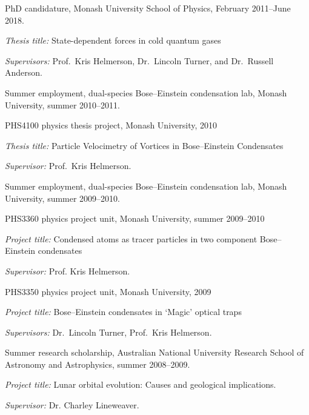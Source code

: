 \documentclass[10pt,a4paper]{article}
\renewenvironment{itemize}{
  \begin{list}{}{
    \setlength{\leftmargin}{1.5em}
    \setlength{\itemsep}{0.25em}
    \setlength{\parskip}{0pt}
    \setlength{\parsep}{0.25em}
  }
}{
  \end{list}
}
\begin{document}
\begin{itemize}
\item{PhD candidature, Monash University School of Physics, February 2011--June 2018.}
    \begin{itemize}
      \item \textit{Thesis title:}
      State-dependent forces in cold quantum gases
      \item\textit{Supervisors:}
      Prof.~Kris Helmerson, Dr.~Lincoln Turner, and Dr.~Russell Anderson.
    \end{itemize}
\item Summer employment, dual-species Bose--Einstein condensation lab, Monash University, summer 2010--2011.
\item PHS4100 physics thesis project, Monash University, 2010
    \begin{itemize}
      \item \textit{Thesis title:}
      Particle Velocimetry of Vortices in Bose--Einstein Condensates
      \item\textit{Supervisor:}
      Prof.~Kris Helmerson.
    \end{itemize}
\item Summer employment, dual-species Bose--Einstein condensation lab, Monash University, summer 2009--2010.
\item PHS3360 physics project unit, Monash University, summer 2009--2010
    \begin{itemize}
      \item \textit{Project title:}
      Condensed atoms as tracer particles in two component Bose--Einstein condensates
      \item\textit{Supervisor:}
      Prof. Kris Helmerson.
    \end{itemize}
\item PHS3350 physics project unit, Monash University, 2009
    \begin{itemize}
      \item \textit{Project title:}
      Bose--Einstein condensates in `Magic' optical traps
      \item\textit{Supervisors:}
      Dr.~Lincoln Turner, Prof.~Kris Helmerson.
    \end{itemize}    
\item Summer research scholarship, Australian National University Research School of Astronomy and Astrophysics, summer 2008--2009.
    \begin{itemize}
      \item \textit{Project title:}
      Lunar orbital evolution: Causes and geological implications.
      \item\textit{Supervisor:}
      Dr. Charley Lineweaver.
    \end{itemize}

\end{itemize}
\end{document}
